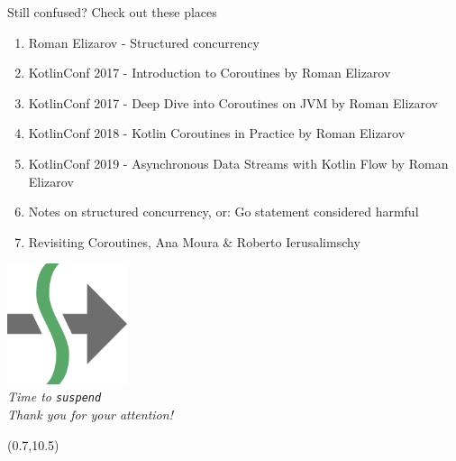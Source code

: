 \documentclass[hyperref={pdfpagelabels=false},xcolor={dvipsnames},compress,onlytextwidth]{beamer}
\begin{document}
    \begin{frame}{Still confused? Check out these places}
        \begin{enumerate}
            \item Roman Elizarov - Structured concurrency \href{https://www.youtube.com/watch?v=Mj5P47F6nJg}{}
            \item KotlinConf 2017 - Introduction to Coroutines by Roman Elizarov \href{https://www.youtube.com/watch?v=_hfBv0a09Jc}{}
            \item KotlinConf 2017 - Deep Dive into Coroutines on JVM by Roman Elizarov \href{https://www.youtube.com/watch?v=YrrUCSi72E8}{}
            \item KotlinConf 2018 - Kotlin Coroutines in Practice by Roman Elizarov \href{https://www.youtube.com/watch?v=a3agLJQ6vt8}{}
            \item KotlinConf 2019 - Asynchronous Data Streams with Kotlin Flow by Roman Elizarov \href{https://www.youtube.com/watch?v=tYcqn48SMT8}{}
            \item Notes on structured concurrency, or: Go statement considered harmful \href{https://web.archive.org/web/20230315053056/https://vorpus.org/blog/notes-on-structured-concurrency-or-go-statement-considered-harmful/}{}
            \item Revisiting Coroutines, Ana Moura \& Roberto Ierusalimschy \href{https://web.archive.org/web/20230128095928/http://www.inf.puc-rio.br/~roberto/docs/MCC15-04.pdf}{}
        \end{enumerate}
    \end{frame}

    {
        \begin{frame}{}
            \centering
            \includegraphics[width=100pt]{images/suspend}\\\vspace{1cm}
            \emph{\Large Time to \texttt{suspend}\\\vspace{0.6cm}Thank you for your attention!}
            \begin{textblock}{0.3}(0.7,10.5)
                \begin{figure}[h!]
                    \centering
                \end{figure}
            \end{textblock}
        \end{frame}
    }
\end{document}

